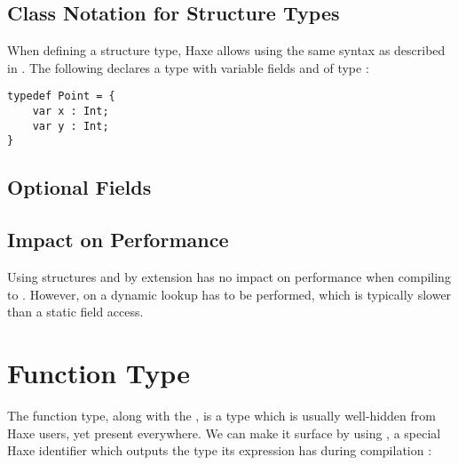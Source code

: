 \subsection{Class Notation for Structure Types}
\label{types-structure-class-notation}

When defining a structure type, Haxe allows using the same syntax as described in . The following  declares a  type with variable fields  and  of type :

\begin{lstlisting}
typedef Point = {
    var x : Int;
    var y : Int;
}
\end{lstlisting}

\subsection{Optional Fields}
\label{types-structure-optional-fields}


\subsection{Impact on Performance}
\label{types-structure-performance}

Using structures and by extension  has no impact on performance when compiling to . However, on  a dynamic lookup has to be performed, which is typically slower than a static field access.



\section{Function Type}
\label{types-function}


The function type, along with the , is a type which is usually well-hidden from Haxe users, yet present everywhere. We can make it surface by using , a special Haxe identifier which outputs the type its expression has during compilation :

